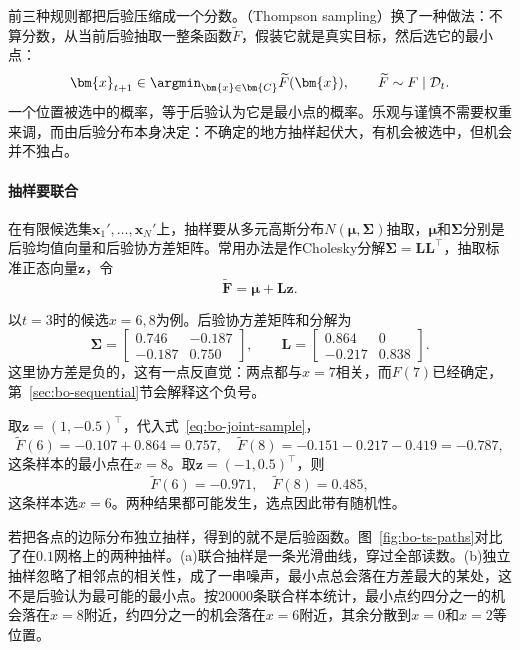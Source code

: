 前三种规则都把后验压缩成一个分数。（Thompson sampling）换了一种做法：不算分数，从当前后验抽取一整条函数$\widetilde{F}$，假装它就是真实目标，然后选它的最小点：
\begin{equation}
 \bm{x}_{t+1}\in\argmin_{\bm{x}\in\bm{C}}\widetilde{F}(\bm{x}),\qquad
 \widetilde{F}\sim F\mid\mathcal{D}_t.
 \label{eq:bo-thompson}
\end{equation}
一个位置被选中的概率，等于后验认为它是最小点的概率。乐观与谨慎不需要权重来调，而由后验分布本身决定：不确定的地方抽样起伏大，有机会被选中，但机会并不独占。

\paragraph{抽样要联合}
在有限候选集$\bm{x}_{1}',\ldots,\bm{x}_{N}'$上，抽样要从多元高斯分布$N(\bm{\mu},\bm{\Sigma})$抽取，$\bm{\mu}$和$\bm{\Sigma}$分别是后验均值向量和后验协方差矩阵。常用办法是作Cholesky分解$\bm{\Sigma}=\bm{L}\bm{L}^\top$，抽取标准正态向量$\bm{z}$，令
\begin{equation}
 \widetilde{\bm{F}}=\bm{\mu}+\bm{L}\bm{z}.
 \label{eq:bo-joint-sample}
\end{equation}

以$t=3$时的候选$x=6,8$为例。后验协方差矩阵和分解为
\[
 \bm{\Sigma}=\begin{bmatrix}0.746&-0.187\\-0.187&0.750\end{bmatrix},\qquad
 \bm{L}=\begin{bmatrix}0.864&0\\-0.217&0.838\end{bmatrix}.
\]
这里协方差是负的，这有一点反直觉：两点都与$x=7$相关，而$F(7)$已经确定，第~\ref{sec:bo-sequential}节会解释这个负号。

取$\bm{z}=(1,-0.5)^\top$，代入式~\eqref{eq:bo-joint-sample}，
\[
 \widetilde{F}(6)=-0.107+0.864=0.757,\quad
 \widetilde{F}(8)=-0.151-0.217-0.419=-0.787,
\]
这条样本的最小点在$x=8$。取$\bm{z}=(-1,0.5)^\top$，则
\[
 \widetilde{F}(6)=-0.971,\quad\widetilde{F}(8)=0.485,
\]
这条样本选$x=6$。两种结果都可能发生，选点因此带有随机性。

若把各点的边际分布独立抽样，得到的就不是后验函数。图~\ref{fig:bo-ts-paths}对比了在$0.1$网格上的两种抽样。(a)联合抽样是一条光滑曲线，穿过全部读数。(b)独立抽样忽略了相邻点的相关性，成了一串噪声，最小点总会落在方差最大的某处，这不是后验认为最可能的最小点。按20000条联合样本统计，最小点约四分之一的机会落在$x=8$附近，约四分之一的机会落在$x=6$附近，其余分散到$x=0$和$x=2$等位置。


